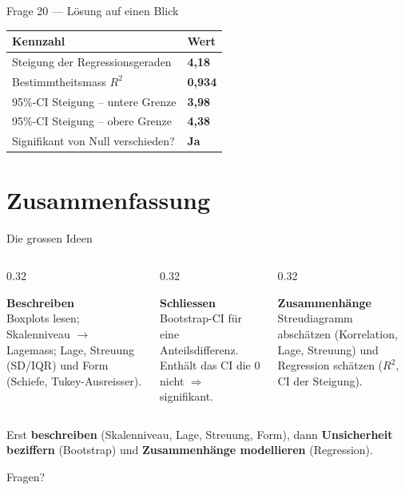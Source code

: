\documentclass[aspectratio=169,11pt]{beamer}
\begin{document}
\begin{frame}{Frage 20 --- Lösung auf einen Blick}
\centering
\renewcommand{\arraystretch}{1.3}
\begin{tabular}{ll}
\toprule
Kennzahl & Wert \\
\midrule
Steigung der Regressionsgeraden & \textbf{4{,}18} \\
Bestimmtheitsmass $R^2$         & \textbf{0{,}934} \\
95\%-CI Steigung -- untere Grenze & \textbf{3{,}98} \\
95\%-CI Steigung -- obere Grenze  & \textbf{4{,}38} \\
Signifikant von Null verschieden? & \textbf{Ja} \\
\bottomrule
\end{tabular}
\end{frame}

\section{Zusammenfassung}

\begin{frame}{Die grossen Ideen}
\begin{columns}[T]
\begin{column}{0.32\textwidth}
\begin{konzept}[Fragen 15--17]
\textbf{Beschreiben}\\[3pt]
Boxplots lesen; Skalenniveau $\to$ Lagemass; Lage, Streuung (SD/IQR) und
Form (Schiefe, Tukey-Ausreisser).
\end{konzept}
\end{column}
\begin{column}{0.32\textwidth}
\begin{konzept}[Frage 18]
\textbf{Schliessen}\\[3pt]
Bootstrap-CI für eine Anteilsdifferenz. Enthält das CI die 0 nicht
$\Rightarrow$ signifikant.
\end{konzept}
\end{column}
\begin{column}{0.32\textwidth}
\begin{konzept}[Fragen 19 \& 20]
\textbf{Zusammenhänge}\\[3pt]
Streudiagramm abschätzen (Korrelation, Lage, Streuung) und Regression
schätzen ($R^2$, CI der Steigung).
\end{konzept}
\end{column}
\end{columns}
\vspace{0.4cm}
\begin{merke}
Erst \textbf{beschreiben} (Skalenniveau, Lage, Streuung, Form), dann
\textbf{Unsicherheit beziffern} (Bootstrap) und \textbf{Zusammenhänge
modellieren} (Regression).
\end{merke}
\end{frame}

\begin{frame}[standout]
Fragen?
\end{frame}
\end{document}
